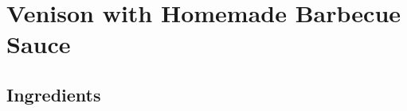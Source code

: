 \thispagestyle{fancy}
\section{Venison with Homemade Barbecue Sauce}
\AddToShipoutPicture*{\VenisonBBQ}

\subsection*{Ingredients}